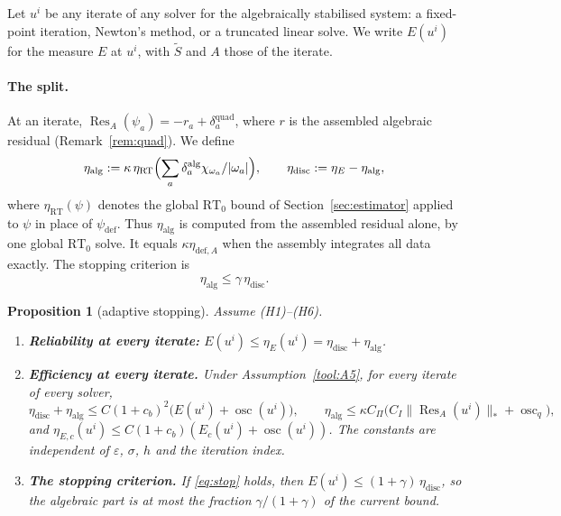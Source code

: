 \documentclass[11pt]{article}
\newcommand{\eps}{\varepsilon}
\newcommand{\Res}{\operatorname{Res}}
\newcommand{\osc}{\operatorname{osc}}
\newcommand{\Stil}{\tilde S}
\newcommand{\RT}{\mathrm{RT}}
\newcommand{\defe}{\mathrm{def}}
\theoremstyle{plain}
\newtheorem{proposition}[theorem]{Proposition}
\theoremstyle{remark}
\numberwithin{equation}{section}
\begin{document}
Let $u^i$ be any iterate of any solver for the algebraically stabilised system: a fixed-point
iteration, Newton's method, or a truncated linear solve. We write $E(u^i)$ for the measure $E$ at
$u^i$, with $\Stil$ and $A$ those of the iterate.

\paragraph{The split.} At an iterate, $\Res_A(\psi_a)=-r_a+\delta_a^{\mathrm{quad}}$, where $r$ is
the assembled algebraic residual (Remark~\ref{rem:quad}). We define
\[
  \eta_{\mathrm{alg}}:=\kappa\,\eta_{\mathrm{RT}}\Bigl(\sum_a\delta_a^{\mathrm{alg}}\chi_{\omega_a}/|\omega_a|\Bigr),
  \qquad
  \eta_{\mathrm{disc}}:=\eta_E-\eta_{\mathrm{alg}},
\]
where $\eta_{\mathrm{RT}}(\psi)$ denotes the global $\RT_0$ bound of Section~\ref{sec:estimator}
applied to $\psi$ in place of $\psi_\defe$. Thus $\eta_{\mathrm{alg}}$ is computed from the
assembled residual alone, by one global $\RT_0$ solve. It equals $\kappa\eta_{\defe,A}$ when the
assembly integrates all data exactly. The stopping criterion is
\begin{equation}\label{eq:stop}
  \eta_{\mathrm{alg}}\le\gamma\,\eta_{\mathrm{disc}}.
\end{equation}

\begin{proposition}[adaptive stopping]\label{prop:stop}
Assume (H1)--(H6).
\begin{enumerate}
  \item \textbf{Reliability at every iterate:} $E(u^i)\le\eta_E(u^i)=\eta_{\mathrm{disc}}+\eta_{\mathrm{alg}}$.
  \item \textbf{Efficiency at every iterate.} Under Assumption~\ref{tool:A5}, for every iterate of
  every solver,
  \[
    \eta_{\mathrm{disc}}+\eta_{\mathrm{alg}}\le C(1+c_b)^2\bigl(E(u^i)+\osc(u^i)\bigr),\qquad
    \eta_{\mathrm{alg}}\le\kappa C_\Pi\bigl(C_I\|\Res_A(u^i)\|_*+\osc_q\bigr),
  \]
  and $\eta_{E,c}(u^i)\le C(1+c_b)(E_c(u^i)+\osc(u^i))$. The constants are independent of $\eps$,
  $\sigma$, $h$ and the iteration index.
  \item \textbf{The stopping criterion.} If \eqref{eq:stop} holds, then
  $E(u^i)\le(1+\gamma)\,\eta_{\mathrm{disc}}$, so the algebraic part is at most the fraction
  $\gamma/(1+\gamma)$ of the current bound.
\end{enumerate}
\end{proposition}
\end{document}
